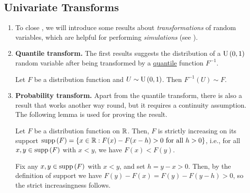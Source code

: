 \subsection{Univariate Transforms}
\label{subsect:univariate-trans}
\begin{enumerate}
\item To close , we will introduce some results about
\emph{transformations} of random variables, which are helpful for
performing \emph{simulations} (see ).
\item \textbf{Quantile transform.} The first results suggests the distribution
of a \(\operatorname{U}\left(0,1\right)\) random variable after being transformed by a
\underline{quantile} function \(F^{-1}\).

\begin{proposition}
\label{prp:quantile-trans}
Let \(F\) be a distribution function and \(U\sim\operatorname{U}\left(0,1\right)\). Then
\(F^{-1}(U)\sim F\).
\end{proposition}
\item \textbf{Probability transform.} Apart from the quantile transform, there
is also a result that works another way round, but it requires a continuity
assumption. The following lemma is used for proving the result.

\begin{lemma}
\label{lma:strict-incr-support}
Let \(F\) be a distribution function on \(\mathbb{R}\). Then, \(F\) is strictly
increasing on its support \(\operatorname{supp}\left(F\right)=\{x\in\mathbb{R}:F(x)-F(x-h)>0\text{ for all
}h>0\}\), i.e., for all \(x,y\in\operatorname{supp}\left(F\right)\) with \(x<y\), we have
\(F(x)<F(y)\).
\end{lemma}
\begin{pf}
Fix any \(x,y\in\operatorname{supp}\left(F\right)\) with \(x<y\), and set \(h=y-x>0\). Then, by the
definition of support we have \(F(y)-F(x)=F(y)-F(y-h)>0\), so the strict
increasingness follows.
\end{pf}


\end{enumerate}
